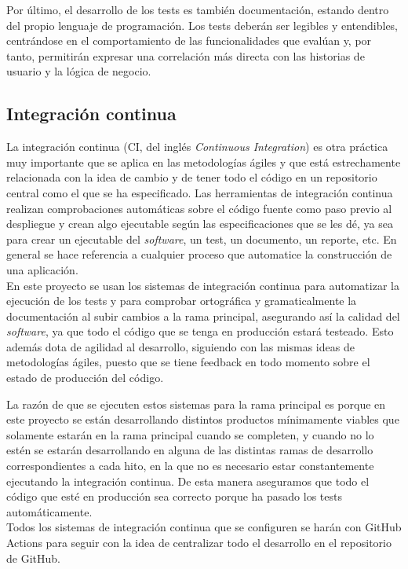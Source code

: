 Por último, el desarrollo de los tests es también documentación, estando dentro
del propio lenguaje de programación. Los tests deberán ser legibles y
entendibles, centrándose en el comportamiento de las funcionalidades que evalúan
y, por tanto, permitirán expresar una correlación más directa con las historias
de usuario y la lógica de negocio.

\subsection{Integración continua}
La integración continua (CI, del inglés \textit{Continuous Integration}) es otra
práctica muy importante que se aplica en las metodologías ágiles y que está
estrechamente relacionada con la idea de cambio y de tener todo el código en un
repositorio central como el que se ha especificado. Las herramientas de
integración continua realizan comprobaciones automáticas sobre el código fuente
como paso previo al despliegue y crean algo ejecutable según las
especificaciones que se les dé, ya sea para crear un ejecutable del
\textit{software}, un test, un documento, un reporte, etc. En general se hace
referencia a cualquier proceso que automatice la construcción de una
aplicación.\\

En este proyecto se usan los sistemas de integración continua para automatizar
la ejecución de los tests y para comprobar ortográfica y gramaticalmente la
documentación al subir cambios a la rama principal, asegurando así la calidad
del \textit{software}, ya que todo el código que se tenga en producción estará
testeado. Esto además dota de agilidad al desarrollo, siguiendo con las mismas
ideas de metodologías ágiles, puesto que se tiene feedback en todo momento sobre
el estado de producción del código.

La razón de que se ejecuten estos sistemas para la rama principal es porque en
este proyecto se están desarrollando distintos productos mínimamente viables que
solamente estarán en la rama principal cuando se completen, y cuando no lo estén
se estarán desarrollando en alguna de las distintas ramas de desarrollo
correspondientes a cada hito, en la que no es necesario estar constantemente
ejecutando la integración continua. De esta manera aseguramos que todo el código
que esté en producción sea correcto porque ha pasado los tests
automáticamente.\\

Todos los sistemas de integración continua que se configuren se harán con GitHub
Actions para seguir con la idea de centralizar todo el desarrollo en el
repositorio de GitHub.

